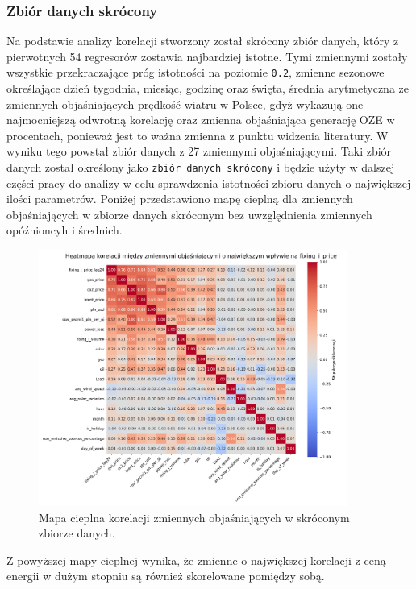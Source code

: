 \subsubsection{Zbiór danych skrócony}
\label{sec:shortened_dataset}
Na podstawie analizy korelacji stworzony został skrócony zbiór danych, który z pierwotnych 54 regresorów zostawia najbardziej istotne. Tymi zmiennymi zostały wszystkie przekraczające próg istotności na poziomie \texttt{0.2},  zmienne sezonowe określające dzień tygodnia, miesiąc, godzinę oraz święta, średnia arytmetyczna ze zmiennych objaśniających prędkość wiatru w Polsce, gdyż wykazują one najmocniejszą odwrotną korelację oraz zmienna objaśniająca generację OZE w procentach, ponieważ jest to ważna zmienna z punktu widzenia literatury. W wyniku tego powstał zbiór danych z 27 zmiennymi objaśniającymi. Taki zbiór danych został określony jako \texttt{zbiór danych skrócony} i będzie użyty w dalszej części pracy do analizy w celu sprawdzenia istotności zbioru danych o największej ilości parametrów. Poniżej przedstawiono mapę cieplną dla zmiennych objaśniających w zbiorze danych skróconym bez uwzględnienia zmiennych opóźnioncyh i średnich. 

\begin{figure}[H]
    \centering
    \includegraphics[width=0.9\textwidth]{../plots/heatmap_short_db_features.png}
    \caption{Mapa cieplna korelacji zmiennych objaśniających w skróconym zbiorze danych.}
    \label{fig:heatmap_shortened_dataset}
\end{figure}

Z powyższej mapy cieplnej wynika, że zmienne o największej korelacji z ceną energii w dużym stopniu są również skorelowane pomiędzy sobą. 

